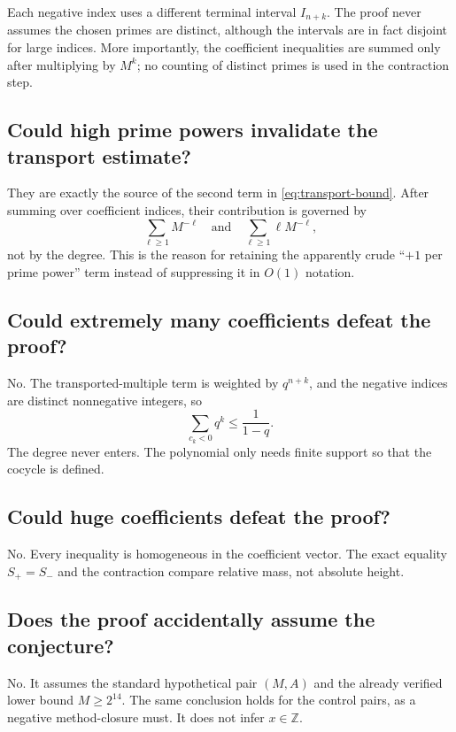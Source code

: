 \documentclass[11pt,oneside]{article}
\theoremstyle{definition}
\theoremstyle{remark}
\newcommand{\Z}{\mathbb Z}
\begin{document}
Each negative index uses a different terminal interval $I_{n+k}$.  The proof never assumes
the chosen primes are distinct, although the intervals are in fact disjoint for large
indices.  More importantly, the coefficient inequalities are summed only after multiplying
by $M^k$; no counting of distinct primes is used in the contraction step.

\subsection{Could high prime powers invalidate the transport estimate?}

They are exactly the source of the second term in \eqref{eq:transport-bound}.  After summing
over coefficient indices, their contribution is governed by
\[
 \sum_{\ell\ge1}M^{-\ell}
 \quad\text{and}\quad
 \sum_{\ell\ge1}\ell M^{-\ell},
\]
not by the degree.  This is the reason for retaining the apparently crude ``$+1$ per prime
power'' term instead of suppressing it in $O(1)$ notation.

\subsection{Could extremely many coefficients defeat the proof?}

No.  The transported-multiple term is weighted by $q^{n+k}$, and the negative indices are
distinct nonnegative integers, so
\[
 \sum_{c_k<0}q^k\le\frac1{1-q}.
\]
The degree never enters.  The polynomial only needs finite support so that the cocycle is
defined.

\subsection{Could huge coefficients defeat the proof?}

No.  Every inequality is homogeneous in the coefficient vector.  The exact equality
$S_+=S_-$ and the contraction compare relative mass, not absolute height.

\subsection{Does the proof accidentally assume the conjecture?}

No.  It assumes the standard hypothetical pair $(M,A)$ and the already verified lower bound
$M\ge2^{14}$.  The same conclusion holds for the control pairs, as a negative method-closure
must.  It does not infer $x\in\Z$.
\end{document}
